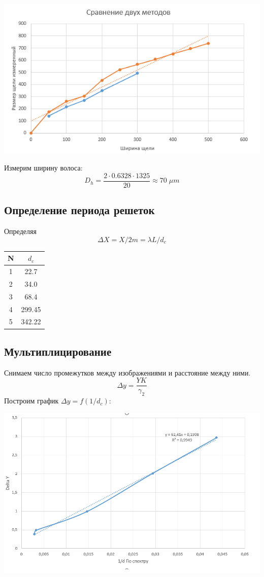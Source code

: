 \documentclass[12pt,a4paper]{article}
\begin{document}
\begin{center}
\includegraphics[scale=1]{434_g2.png}
\end{center}
Измерим ширину волоса:
\[ D_h  = \frac{2 \cdot 0.6328 \cdot1325}{20} \approx 70\; \mu m\]
\subsection{Определение периода решеток}

Определяя 
\[\Delta X = X/2m = \lambda L /d_c \]
\begin{center}
\begin{tabular}{|c|c|}
\hline 
N & $d_c$ \\ 
\hline 
1 & 22.7 \\ 
\hline 
2 & 34.0 \\ 
\hline 
3 & 68.4 \\ 
\hline 
4 & 299.45 \\ 
\hline 
5 & 342.22 \\ 
\hline 
\end{tabular} 

\end{center}
\subsection{Мультиплицирование}
Снимаем число промежутков между изображениями и расстояние между ними.
\[\Delta y = \frac{YK}{\gamma_2} \]
Построим график $\Delta y = f(1/d_c)$:\\

\begin{center}
\includegraphics[scale=1]{434_g3.png}
\end{center}
\end{document}
